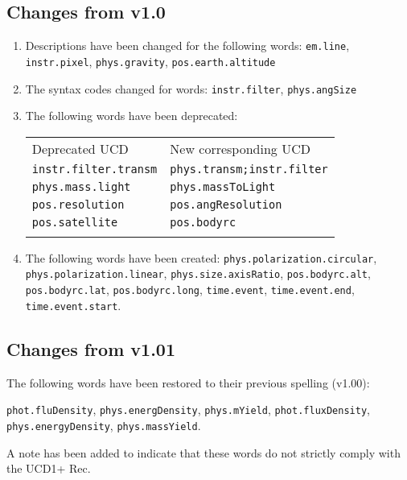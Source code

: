 \documentclass[11pt,a4paper]{ivoa}
\begin{document}
\subsection{Changes from v1.0}
\begin{enumerate}
\item Descriptions have been changed for the following words: {\tt em.line}, {\tt instr.pixel}, 
{\tt phys.gravity}, {\tt pos.earth.altitude}
\item The syntax codes changed for words: {\tt instr.filter}, {\tt phys.angSize}
\item The following words have been deprecated:

\begin{tabular}{|l|l|}
\sptablerule
Deprecated UCD & New corresponding UCD\\
\sptablerule
{\tt instr.filter.transm} & {\tt phys.transm;instr.filter}\\
{\tt phys.mass.light} & {\tt phys.massToLight}\\
{\tt pos.resolution} & {\tt pos.angResolution}\\
{\tt pos.satellite} & {\tt pos.bodyrc}\\
\sptablerule
\end{tabular}

\item \begin{flushleft}
The following words have been created: 
{\tt phys.polarization.circular}, 
{\tt phys.polarization.linear}, {\tt phys.size.axisRatio}, {\tt pos.bodyrc.alt}, 
{\tt pos.bodyrc.lat}, {\tt pos.bodyrc.long}, {\tt time.event}, {\tt time.event.end}, 
{\tt time.event.start}.
\end{flushleft}
\end{enumerate}

\subsection{Changes from v1.01}

The following words have been restored to their previous spelling (v1.00): 
\begin{flushleft}
{\tt phot.fluDensity}, 
{\tt phys.energDensity}, {\tt phys.mYield}, {\tt phot.fluxDensity}, {\tt phys.energyDensity}, 
{\tt phys.massYield}.
\end{flushleft}

A note has been added to indicate that these words do not strictly comply with the UCD1+ Rec.
\end{document}
